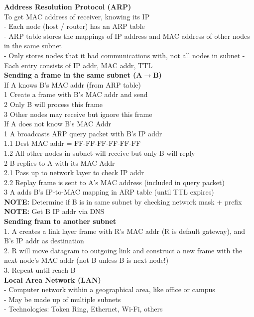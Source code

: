 \documentclass[10pt, a4paper]{article}
\newcommand{\highlight}[1]{{\color{red}\textbf{#1}}}
\newcommand{\blue}[1]{{\color{MidnightBlue}#1}}
\newcommand{\red}[1]{{\color{red}#1}}
\newcommand{\tab}[0]{\hspace*{2mm}}
\begin{document}
\begin{multicols*}{3}
		\textbf{Address Resolution Protocol (ARP)}\\
		To get MAC address of receiver, knowing its IP\\
		- Each node (host / router) has an \blue{ARP table}\\
		- ARP table stores the mappings of IP address and MAC address of other nodes in the \red{same subnet}\\
		- Only stores nodes that it had communications with, not all nodes in subnet
		- Each entry consists of \red{IP addr, MAC addr, TTL}\\

		\textbf{Sending a frame in the same subnet (A$\rightarrow$B)}\\
		If A knows B's MAC addr (from ARP table)\\
		\tab 1 Create a frame with B's MAC addr and send\\
		\tab 2 \red{Only B} will process this frame\\
		\tab 3 Other nodes may receive but ignore this frame\\
		If A does not know B's MAC Addr\\
		\tab 1 A \red{broadcasts ARP query packet} with B's \blue{IP addr}\\
		\tab\tab 1.1 Dest MAC addr = FF-FF-FF-FF-FF-FF\\
		\tab\tab 1.2 All other nodes in subnet will receive but only B will reply\\
		\tab 2 B replies to A with its MAC Addr\\
		\tab\tab 2.1 Pass up to network layer to check IP addr\\
		\tab\tab 2.2 Replay frame is sent to A's MAC address (included in query packet)\\
		\tab 3 A adds B's IP-to-MAC mapping in ARP table (until TTL expires)\\
		\highlight{NOTE:} Determine if B is in same subnet by checking network mask + prefix\\
		\highlight{NOTE:} Get B IP addr via DNS\\

		\textbf{Sending fram to \red{another} subnet}\\
		1. A creates a link layer frame with \red{R's MAC addr} (R is default gateway), and \red{B's IP addr} as destination\\
		2. R will move datagram to outgoing link and construct a new frame with the \red{next node's MAC addr} (not B unless B is next node!)\\
		3. Repeat until reach B\\
		\textbf{Local Area Network (LAN)}\\
		- Computer network within a geographical area, like office or campus\\
		- May be made up of multiple subnets\\
		- Technologies: Token Ring, Ethernet, Wi-Fi, others\\


\end{multicols*}
\end{document}
